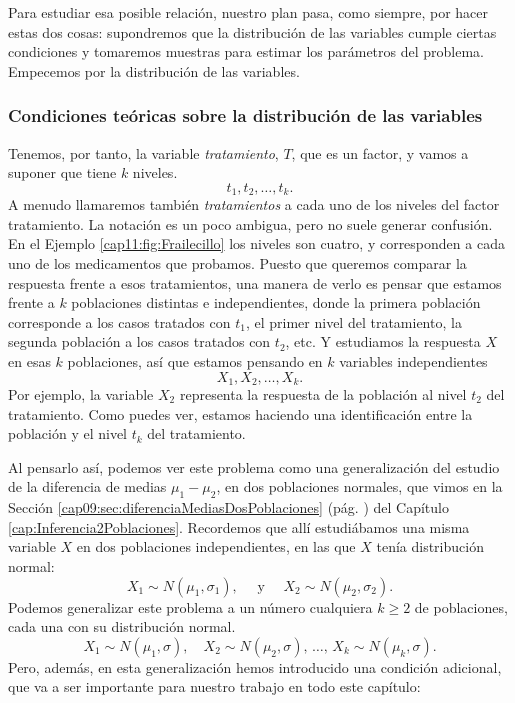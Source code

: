 Para estudiar esa posible relación, nuestro plan pasa, como siempre, por hacer estas dos cosas:
supondremos que la distribución de las variables cumple ciertas condiciones y tomaremos muestras
para estimar los parámetros del problema. Empecemos por la distribución de las variables.

\subsubsection{Condiciones teóricas sobre la distribución de las variables}

Tenemos, por tanto, la variable {\em tratamiento}, $T$, que es un factor,
y vamos a suponer que tiene $k$ niveles.
\[t_1, t_2, \ldots, t_k.\]
A menudo llamaremos también {\em tratamientos} a cada uno de los niveles del factor tratamiento. La notación es un poco ambigua, pero no suele generar confusión. En el Ejemplo \ref{cap11:fig:Frailecillo} los niveles son cuatro, y corresponden a cada uno de los medicamentos que probamos. Puesto que queremos comparar la respuesta frente a esos tratamientos, una manera de verlo es pensar que estamos frente a $k$ poblaciones distintas e independientes,
donde la primera población corresponde a los casos tratados con $t_1$, el primer nivel del tratamiento, la segunda población a los casos tratados con $t_2$, etc. Y estudiamos la respuesta $X$ en esas $k$ poblaciones, así que estamos pensando en $k$ variables independientes
\[X_1, X_2, \ldots, X_k.\]
Por ejemplo, la variable $X_2$ representa la respuesta de la población al nivel $t_2$ del tratamiento. Como puedes ver, estamos haciendo una identificación entre la población y el nivel $t_k$ del tratamiento.

Al pensarlo así, podemos ver este problema como una generalización del estudio de la diferencia de medias $\mu_1-\mu_2$, en dos poblaciones normales, que vimos en la Sección \ref{cap09:sec:diferenciaMediasDosPoblaciones} (pág. \pageref{cap09:sec:diferenciaMediasDosPoblaciones}) del Capítulo \ref{cap:Inferencia2Poblaciones}. Recordemos que allí estudiábamos una misma variable $X$ en dos poblaciones independientes, en las que $X$ tenía distribución normal:
    \[
    X_1\sim N\left(\mu_1,\sigma_1\right),
    \quad\mbox{ y }\quad
    X_2\sim N\left(\mu_2,\sigma_2\right).\]
Podemos generalizar este problema a un número cualquiera $k\geq 2$ de poblaciones, cada una con su distribución normal.
 \[
    X_1\sim N\left(\mu_1,\sigma\right),
    \quad
    X_2\sim N\left(\mu_2,\sigma\right),
    \,\ldots,\,
    X_k\sim N\left(\mu_k,\sigma\right).
 \]
Pero, además, en esta generalización hemos introducido una condición adicional, que va a ser importante para nuestro trabajo en todo este capítulo:
